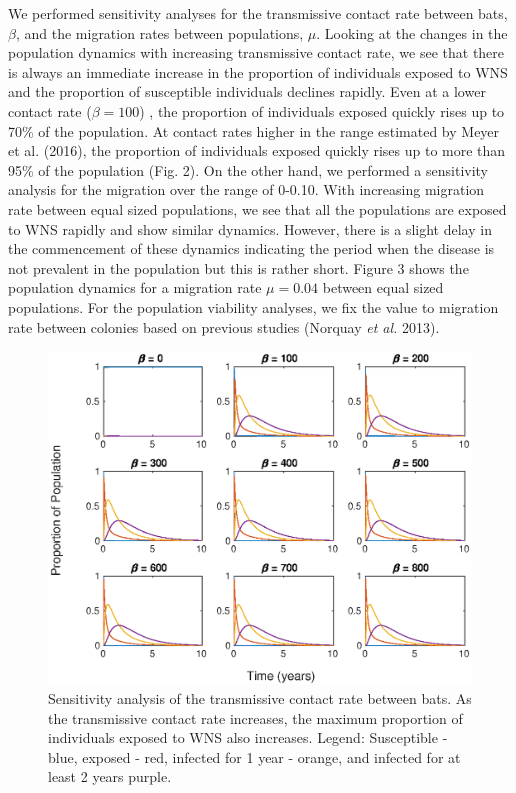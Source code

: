 \documentclass[12pt]{article}
\begin{document}
We performed sensitivity analyses for the transmissive contact rate between bats, $\beta$,  and the migration rates between populations, $\mu$. Looking at the changes in the population dynamics with increasing transmissive contact rate, we see that there is always an immediate increase in the proportion of individuals exposed to WNS and the proportion of susceptible individuals declines rapidly. Even at a lower contact rate ($\beta = 100$) , the proportion of individuals exposed quickly rises up to 70\% of the population. At contact rates higher in the range estimated by Meyer et al. (2016), the proportion of individuals exposed quickly rises up to more than 95\% of the population (Fig. 2). On the other hand, we performed a sensitivity analysis for the migration over the range of 0-0.10. With increasing migration rate between equal sized populations, we see that all the populations are exposed to WNS rapidly and show similar dynamics. However, there is a slight delay in the commencement of these dynamics indicating the period when the disease is not prevalent in the population but this is rather short. Figure 3 shows the population dynamics for a migration rate $\mu = 0.04$ between equal sized populations. For the population viability analyses, we fix the value to migration rate between colonies based on previous studies (Norquay \textit{et al.} 2013). 

\begin{figure}
    \centering
    \includegraphics{sens_beta.eps}
    \caption{Sensitivity analysis of the transmissive contact rate between bats. As the transmissive contact rate increases, the maximum  proportion of individuals exposed to WNS also increases. Legend: Susceptible - blue, exposed - red, infected for 1 year - orange, and infected for at least 2 years purple. }
    \label{fig:my_label}
\end{figure}
\end{document}
